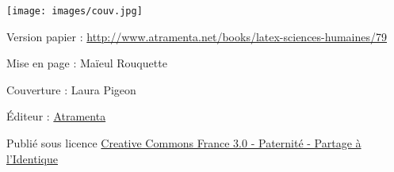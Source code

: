 \thispagestyle{empty}
\noindent\texttt{[image: images/couv.jpg]}
\restoregeometry

\null\vfill

{\small Version papier : \url{http://www.atramenta.net/books/latex-sciences-humaines/79}

Mise en page : Maïeul Rouquette

Couverture : Laura Pigeon

Éditeur : \href{http://www.atramenta.fr}{Atramenta}

Publié sous licence \href{http://creativecommons.org/licenses/by-sa/3.0/fr/}{Creative Commons France 3.0 - Paternité - Partage à l'Identique}}
\thispagestyle{empty}
